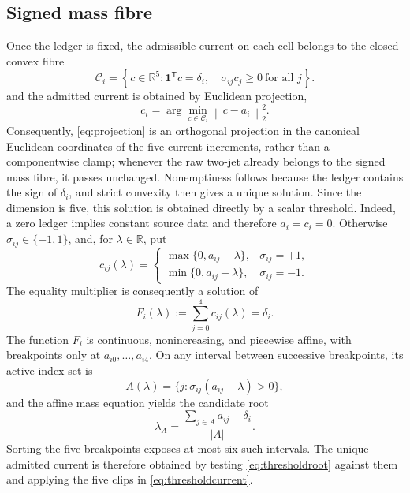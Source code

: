 \documentclass[journal]{IEEEtran}
\newcommand{\R}{\mathbb{R}}
\newcommand{\Ccal}{\mathcal{C}}
\newcommand{\norm}[1]{\left\lVert#1\right\rVert}
\begin{document}
\subsection{Signed mass fibre}

Once the ledger is fixed, the admissible current on each cell belongs to the
closed convex fibre
\begin{equation}
 \Ccal_i=
 \left\{c\in\R^5:
 \bm1^\mathsf Tc=\delta_i,\quad
 \sigma_{ij}c_j\geq0\ \text{for all }j
 \right\}.
 \label{eq:fibre}
\end{equation}
and the admitted current is obtained by Euclidean projection,
\begin{equation}
 c_i=\arg\min_{c\in\Ccal_i}\norm{c-a_i}_2^2.
 \label{eq:projection}
\end{equation}
Consequently, \eqref{eq:projection} is an orthogonal projection in the
canonical Euclidean coordinates of the five current increments, rather than
a componentwise clamp; whenever the raw two-jet already belongs to the signed
mass fibre, it passes unchanged. Nonemptiness follows because the ledger
contains the sign of \(\delta_i\), and strict convexity then gives a unique
solution. Since the dimension is five, this solution is obtained directly by
a scalar threshold. Indeed, a zero ledger implies constant source data and
therefore \(a_i=c_i=0\). Otherwise
\(\sigma_{ij}\in\{-1,1\}\), and, for \(\lambda\in\R\), put
\begin{equation}
 c_{ij}(\lambda)=
 \begin{cases}
 \max\{0,a_{ij}-\lambda\},&\sigma_{ij}=+1,\\
 \min\{0,a_{ij}-\lambda\},&\sigma_{ij}=-1.
 \end{cases}
 \label{eq:thresholdcurrent}
\end{equation}
The equality multiplier is consequently a solution of
\begin{equation}
 F_i(\lambda):=\sum_{j=0}^{4}c_{ij}(\lambda)=\delta_i.
 \label{eq:thresholdmass}
\end{equation}
The function \(F_i\) is continuous, nonincreasing, and piecewise affine,
with breakpoints only at \(a_{i0},\ldots,a_{i4}\). On any interval between
successive breakpoints, its active index set is
\begin{equation}
 A(\lambda)=\{j:\sigma_{ij}(a_{ij}-\lambda)>0\},
\end{equation}
and the affine mass equation yields the candidate root
\begin{equation}
 \lambda_A=\frac{\sum_{j\in A}a_{ij}-\delta_i}{|A|}.
 \label{eq:thresholdroot}
\end{equation}
Sorting the five breakpoints exposes at most six such intervals. The unique
admitted current is therefore obtained by testing
\eqref{eq:thresholdroot} against them and applying the five clips in
\eqref{eq:thresholdcurrent}.
\end{document}
